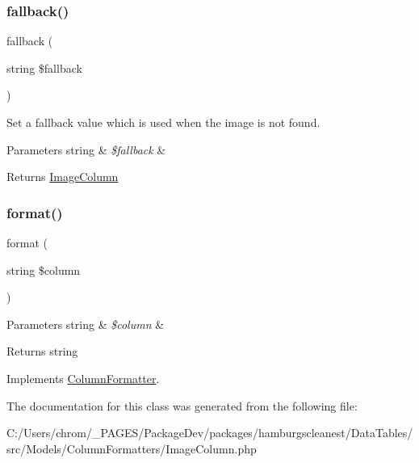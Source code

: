 \subsubsection{\texorpdfstring{fallback()}{fallback()}}
{\footnotesize\ttfamily fallback (\begin{DoxyParamCaption}\item[{string}]{\$fallback }\end{DoxyParamCaption})}

Set a fallback value which is used when the image is not found.


\begin{DoxyParams}[1]{Parameters}
string & {\em \$fallback} & \\
\hline
\end{DoxyParams}
\begin{DoxyReturn}{Returns}
\hyperlink{classhamburgscleanest_1_1_data_tables_1_1_models_1_1_column_formatters_1_1_image_column}{Image\+Column} 
\end{DoxyReturn}
\mbox{\label{classhamburgscleanest_1_1_data_tables_1_1_models_1_1_column_formatters_1_1_image_column_aba259f7ae8b25e70bd444020c04606e7}} 
\subsubsection{\texorpdfstring{format()}{format()}}
{\footnotesize\ttfamily format (\begin{DoxyParamCaption}\item[{string}]{\$column }\end{DoxyParamCaption})}


\begin{DoxyParams}[1]{Parameters}
string & {\em \$column} & \\
\hline
\end{DoxyParams}
\begin{DoxyReturn}{Returns}
string 
\end{DoxyReturn}


Implements \hyperlink{interfacehamburgscleanest_1_1_data_tables_1_1_interfaces_1_1_column_formatter_aba259f7ae8b25e70bd444020c04606e7}{Column\+Formatter}.



The documentation for this class was generated from the following file\+:\begin{DoxyCompactItemize}
\item 
C\+:/\+Users/chrom/\+\_\+\+P\+A\+G\+E\+S/\+Package\+Dev/packages/hamburgscleanest/\+Data\+Tables/src/\+Models/\+Column\+Formatters/Image\+Column.\+php\end{DoxyCompactItemize}

